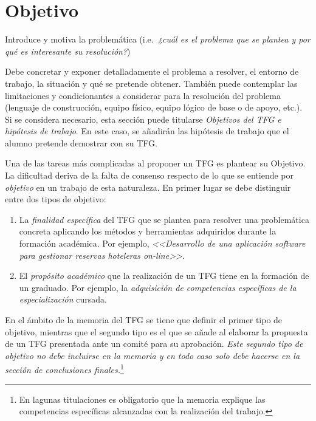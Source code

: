 \chapter{Objetivo}
\label{cap:Objetivo}

Introduce y motiva la problemática (i.e.\emph{\ ¿cuál es el problema que se plantea y por qué es interesante su resolución?})

Debe concretar y exponer detalladamente el problema a resolver, el entorno de 
trabajo, la situación y qué se pretende obtener. También puede contemplar las 
limitaciones y condicionantes a considerar para la resolución del problema 
(lenguaje de construcción, equipo físico, equipo lógico de base o de apoyo, 
etc.). Si se considera necesario, esta sección puede titularse 
\emph{Objetivos del TFG e hipótesis de trabajo}. En este caso, se añadirán 
las hipótesis de trabajo que el alumno pretende demostrar con su TFG.

Una de las tareas más complicadas al proponer un TFG es plantear su \textsf{Objetivo}. La dificultad deriva de la falta de consenso respecto de lo que se entiende por \emph{objetivo} en un trabajo de esta naturaleza. En primer lugar se debe distinguir entre dos tipos de objetivo:

\begin{enumerate}
	\item La \emph{finalidad específica} del TFG que se plantea para resolver una problemática concreta aplicando los métodos y herramientas adquiridos durante la formación académica. Por ejemplo, \emph{<<Desarrollo de una aplicación software para gestionar reservas hoteleras \emph{on-line}>>}.
	
	\item El \emph{propósito académico} que la realización de un TFG tiene en la formación de un graduado. Por ejemplo, la \emph{adquisición de competencias específicas de la especialización} cursada.
\end{enumerate}

En el ámbito de la memoria del TFG se tiene que definir el primer tipo de objetivo, mientras que el segundo tipo es el que se añade al elaborar la propuesta de un TFG presentada ante un comité para su aprobación. \emph{Este segundo tipo de objetivo no debe incluirse en la memoria y en todo caso solo debe hacerse en la sección de conclusiones finales.}\footnote{En lagunas titulaciones es obligatorio que la memoria explique las competencias específicas alcanzadas con la realización del trabajo.}


